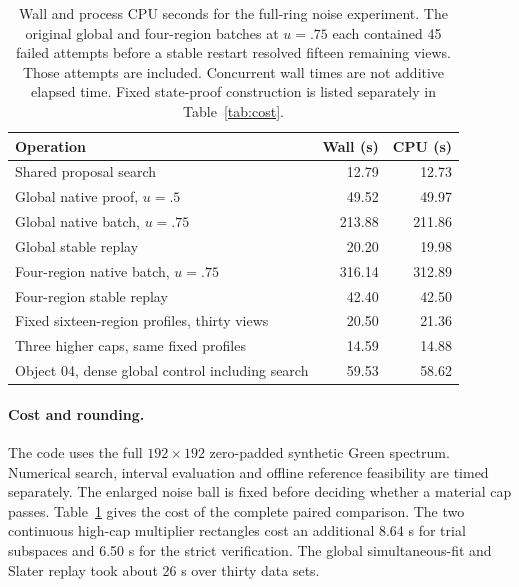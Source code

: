 \documentclass[anonymous,12pt]{iopjournal}
\theoremstyle{remark}\newtheorem{remark}[theorem]{Remark}
\numberwithin{equation}{section}
\begin{document}
\begin{table}[tb]
\caption{Wall and process CPU seconds for the full-ring noise experiment. The original global and four-region batches at $u=.75$ each contained 45 failed attempts before a stable restart resolved fifteen remaining views. Those attempts are included. Concurrent wall times are not additive elapsed time. Fixed state-proof construction is listed separately in Table~\ref{tab:cost}.}\label{tab:replay}
\centering\begin{tabular}{lrr}\toprule
Operation & Wall (s) & CPU (s)\\ \midrule
Shared proposal search &12.79&12.73\\
Global native proof, $u=.5$ &49.52&49.97\\
Global native batch, $u=.75$ &213.88&211.86\\
Global stable replay &20.20&19.98\\
Four-region native batch, $u=.75$ &316.14&312.89\\
Four-region stable replay &42.40&42.50\\
Fixed sixteen-region profiles, thirty views &20.50&21.36\\
Three higher caps, same fixed profiles &14.59&14.88\\
Object 04, dense global control including search &59.53&58.62\\ \bottomrule
\end{tabular}
\end{table}

\paragraph{Cost and rounding.}
The code uses the full $192\times192$ zero-padded synthetic Green spectrum. Numerical search, interval evaluation and offline reference feasibility are timed separately. The enlarged noise ball is fixed before deciding whether a material cap passes. Table~\ref{tab:replay} gives the cost of the complete paired comparison. The two continuous high-cap multiplier rectangles cost an additional 8.64 s for trial subspaces and 6.50 s for the strict verification. The global simultaneous-fit and Slater replay took about 26 s over thirty data sets. 
\end{document}
